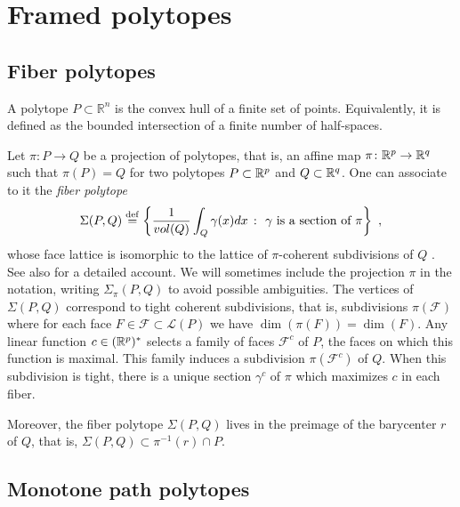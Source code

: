 
\section{Framed polytopes}


\subsection{Fiber polytopes}

A polytope $P \subset \mathbb{R}^n$ is the convex hull of a finite set of points.
Equivalently, it is defined as the bounded intersection of a finite number of half-spaces.

Let $\pi \colon P \to Q$ be a projection of polytopes, that is, an affine map $\pi \colon \mathbb{R}^p \to \mathbb{R}^q$ such that $\pi(P)=Q$ for two polytopes $P\subset \mathbb{R}^p$ and $Q \subset \mathbb{R}^q$.
One can associate to it the \emph{fiber polytope} \[\Sigma(P,Q) \stackrel{\mathrm{def}}{=} \left\{ \frac{1}{vol(Q)}\int_Q \gamma(x)dx \ \colon \ \gamma \text{ is a section of }\pi \right\} \ , \] whose face lattice is isomorphic to the lattice of $\pi$-coherent subdivisions of $Q$ \cite{BilleraSturmfels92}.
See also \cite[Chapter 9]{Ziegler95} for a detailed account.
We will sometimes include the projection $\pi$ in the notation, writing $\Sigma_\pi(P,Q)$ to avoid possible ambiguities. 
The vertices of $\Sigma(P,Q)$ correspond to tight coherent subdivisions, that is, subdivisions $\pi(\mathcal{F})$ where for each face $F \in \mathcal{F}\subset\mathcal{L}(P)$ we have $\dim(\pi(F))=\dim(F)$.
Any linear function $c\in (\mathbb{R}^p)^{*}$ selects a family of faces $\mathcal{F}^c$ of $P$, the faces on which this function is maximal. 
This family induces a subdivision $\pi(\mathcal{F}^c)$ of $Q$.
When this subdivision is tight, there is a unique section $\gamma^c$ of $\pi$ which maximizes $c$ in each fiber.

Moreover, the fiber polytope $\Sigma(P,Q)$ lives in the preimage of the barycenter $r$ of $Q$, that is, $\Sigma(P,Q)\subset\pi^{-1}(r)\cap P$.

\subsection{Monotone path polytopes}

